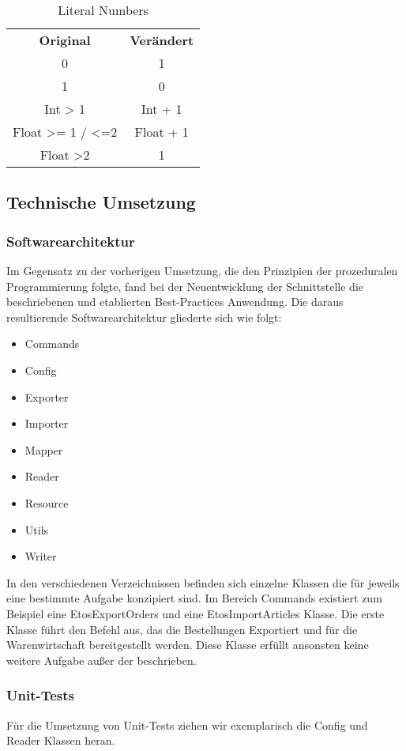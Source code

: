 \begin{table}[H]
	\caption{Literal Numbers}
	\begin{tabular}{cc}
		\textbf{Original} & \textbf{Verändert} \\
		0 & 1 \\
		1 & 0 \\
		Int > 1 & Int + 1 \\
		Float >= 1 / <=2 & Float + 1 \\
		Float >2 & 1 \\
	\end{tabular}
\end{table}

\subsection{Technische Umsetzung}
\subsubsection{Softwarearchitektur}
Im Gegensatz zu der vorherigen Umsetzung, die den Prinzipien der prozeduralen Programmierung folgte, fand bei der Neuentwicklung der Schnittstelle die beschriebenen und etablierten Best-Practices Anwendung. Die daraus resultierende Softwarearchitektur gliederte sich wie folgt:

\begin{itemize}
	\item Commands
	\item Config
	\item Exporter
	\item Importer
	\item Mapper
	\item Reader
	\item Resource
	\item Utils
	\item Writer
\end{itemize}

In den verschiedenen Verzeichnissen befinden sich einzelne Klassen die für jeweils eine bestimmte Aufgabe konzipiert sind. Im Bereich Commands existiert zum Beispiel eine EtosExportOrders und eine EtosImportArticles Klasse. Die erste Klasse führt den Befehl aus, das die Bestellungen Exportiert und für die Warenwirtschaft bereitgestellt werden. Diese Klasse erfüllt ansonsten keine weitere Aufgabe außer der beschrieben.

\subsubsection{Unit-Tests}
Für die Umsetzung von Unit-Tests ziehen wir exemplarisch die Config und Reader Klassen heran.

